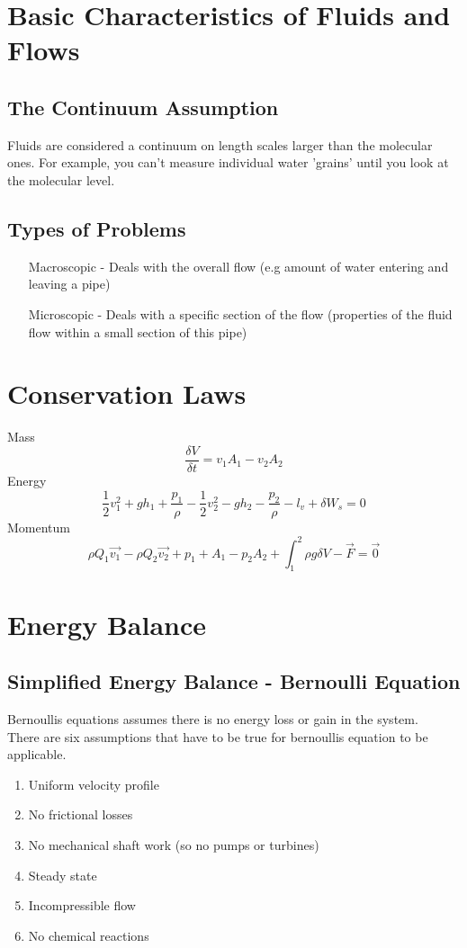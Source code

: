 \documentclass[12pt,a4paper]{article}
\begin{document}
    \newpage

\section{Basic Characteristics of Fluids and Flows}
    \subsection{The Continuum Assumption}
        Fluids are considered a continuum on length scales larger than the molecular ones. For example, you can't measure individual water 'grains' until you look at the molecular level.
    
    \subsection{Types of Problems}
        \begin{itemize}
            \item[Macroscopic - ] Deals with the overall flow (e.g amount of water entering and leaving a pipe)
            \item[Microscopic - ] Deals with a specific section of the flow (properties of the fluid flow within a small section of this pipe)
        \end{itemize}

\newpage
            
\section{Conservation Laws}
    Mass
    \[\frac{\delta V}{\delta t}=v_1A_1-v_2A_2\]
    Energy
    \[\frac{1}{2}v^2_1+gh_1+\frac{p_1}{\rho}-\frac{1}{2}v^2_2-gh_2-\frac{p_2}{\rho}-l_v+\delta W_s=0 \]
    Momentum
    \[\rho Q_1\vec{v_1}-\rho Q_2\vec{v_2}+p_1+A_1-p_2A_2+\int_{1}^{2}\rho g \delta V -\vec{F}=\vec{0}\]

\newpage

\section{Energy Balance}
    \subsection{Simplified Energy Balance - Bernoulli Equation}
        Bernoullis equations assumes there is no energy loss or gain in the system. \\
        There are six assumptions that have to be true for bernoullis equation to be applicable.
        \begin{enumerate}
            \item Uniform velocity profile
            \item No frictional losses
            \item No mechanical shaft work (so no pumps or turbines)
            \item Steady state
            \item Incompressible flow
            \item No chemical reactions
        \end{enumerate}
\end{document}
